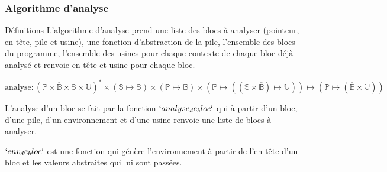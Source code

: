 \documentclass{beamer}
\begin{document}
\fi

\subsubsection{Algorithme d'analyse}

\begin{frame}{Définitions}
    L'algorithme d'analyse prend une liste des blocs à analyser (pointeur, en-tête, pile et usine), une fonction d'abstraction de la pile, l'ensemble des blocs du programme, l'ensemble des usines pour chaque contexte de chaque bloc déjà analysé et renvoie en-tête et usine pour chaque bloc.

    $\text{analyse} : (\mathbb{P} \times \overline{\mathbb{B}} \times \mathbb{S} \times \mathbb{U})^{*} \times (\mathbb{S} \mapsto \mathbb{S}) \times (\mathbb{P} \mapsto \mathbb{B}) \times (\mathbb{P} \mapsto ((\mathbb{S} \times \overline{\mathbb{B}}) \mapsto \mathbb{U})) \mapsto (\mathbb{P} \mapsto (\overline{\mathbb{B}} \times \mathbb{U}))$

    L'analyse d'un bloc se fait par la fonction $`analyse_de_bloc`$ qui à partir d'un bloc, d'une pile, d'un environnement et d'une usine renvoie une liste de blocs à analyser.

    $`env_de_bloc`$ est une fonction qui génère l'environnement à partir de l'en-tête d'un bloc et les valeurs abstraites qui lui sont passées.
\end{frame}
\end{document}
